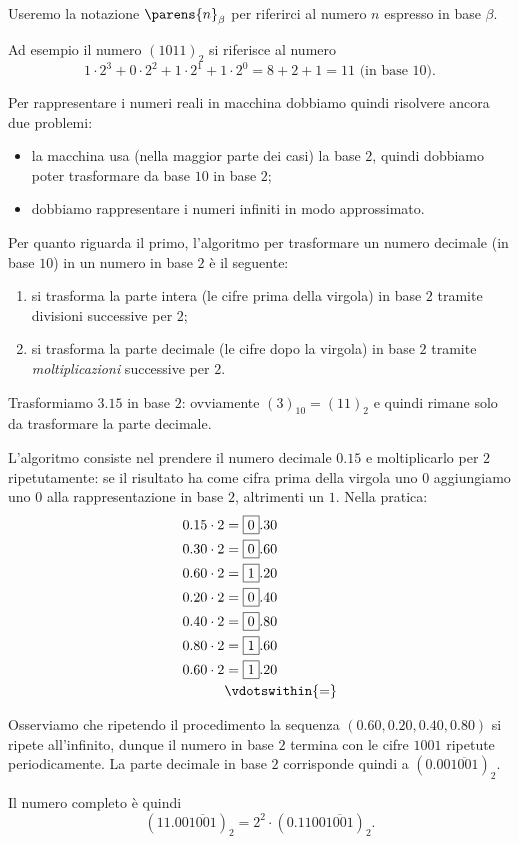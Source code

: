 \begin{notation}
    Useremo la notazione $\parens{n}_\beta$ per riferirci al numero $n$ espresso in base $\beta$. 
\end{notation}

Ad esempio il numero $(1011)_2$ si riferisce al numero \[
    1 \cdot 2^3 + 0 \cdot 2^2 + 1 \cdot 2^1 + 1 \cdot 2^0 = 8 + 2 + 1 = 11 \text{ (in base $10$).}
\]

Per rappresentare i numeri reali in macchina dobbiamo quindi risolvere ancora due problemi:
\begin{itemize}
    \item la macchina usa (nella maggior parte dei casi) la base $2$, quindi dobbiamo poter trasformare da base $10$ in base $2$;
    \item dobbiamo rappresentare i numeri infiniti in modo approssimato.
\end{itemize}

Per quanto riguarda il primo, l'algoritmo per trasformare un numero decimale (in base $10$) in un numero in base $2$ è il seguente:
\begin{enumerate}
    \item si trasforma la parte intera (le cifre prima della virgola) in base $2$ tramite divisioni successive per $2$;
    \item si trasforma la parte decimale (le cifre dopo la virgola) in base $2$ tramite \emph{moltiplicazioni} successive per $2$.
\end{enumerate}

\begin{example}
    Trasformiamo $3.15$ in base $2$: ovviamente $(3)_{10} = (11)_2$ e quindi rimane solo da trasformare la parte decimale. 
    
    L'algoritmo consiste nel prendere il numero decimale $0.15$ e moltiplicarlo per $2$ ripetutamente: se il risultato ha come cifra prima della virgola uno $0$ aggiungiamo uno $0$ alla rappresentazione in base $2$, altrimenti un $1$. Nella pratica:
    \begin{align*}
        0.15 \cdot 2 &= \boxed{0}.30 \\
        0.30 \cdot 2 &= \boxed{0}.60 \\
        0.60 \cdot 2 &= \boxed{1}.20 \\
        0.20 \cdot 2 &= \boxed{0}.40 \\
        0.40 \cdot 2 &= \boxed{0}.80 \\
        0.80 \cdot 2 &= \boxed{1}.60 \\
        0.60 \cdot 2 &= \boxed{1}.20 \\
        &\vdotswithin{=} 
    \end{align*} 

    Osserviamo che ripetendo il procedimento la sequenza $(0.60, 0.20, 0.40, 0.80)$ si ripete all'infinito, dunque il numero in base $2$ termina con le cifre $1001$ ripetute periodicamente. La parte decimale in base $2$ corrisponde quindi a $(0.00\overline{1001})_2$.

    Il numero completo è quindi \[
        (11.00\overline{1001})_2 = 2^2 \cdot (0.1100\overline{1001})_2.
    \]
\end{example}

